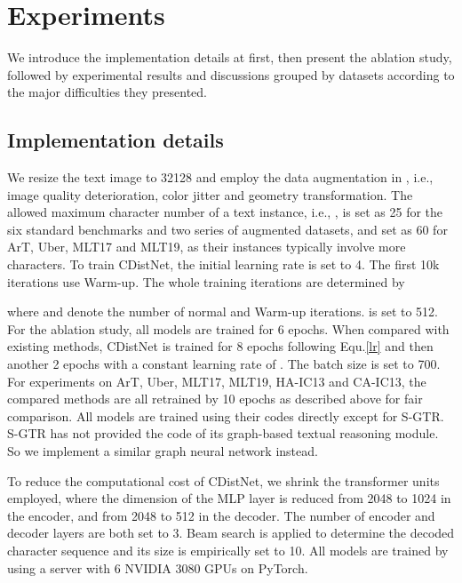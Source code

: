 \section{Experiments}
We introduce the implementation details at first, then present the ablation study, followed by experimental results and discussions grouped by datasets according to the major difficulties they presented.

\subsection{Implementation details}
We resize the text image to 32128 and employ the data augmentation in \citep{ABInet21CVPR}, i.e., image quality deterioration, color jitter and geometry transformation. The allowed maximum character number of a text instance, i.e., , is set as 25 for the six standard benchmarks and two series of augmented datasets, and set as 60 for ArT, Uber, MLT17 and MLT19, as their instances typically involve more characters. To train CDistNet, the initial learning rate is set to 4. The first 10k iterations use Warm-up. The whole training iterations are determined by  

where  and  denote the number of normal and Warm-up iterations.  is set to 512. For the ablation study, all models are trained for 6 epochs. When compared with existing methods, CDistNet is trained for 8 epochs following Equ.\ref{lr} and then another 2 epochs with a constant learning rate of . The batch size is set to 700. For experiments on ArT, Uber, MLT17, MLT19, HA-IC13 and CA-IC13, the compared methods are all retrained by 10 epochs as described above for fair comparison. All models are trained using their codes directly except for S-GTR. S-GTR has not provided the code of its graph-based textual reasoning module. So we implement a similar graph neural network instead.

To reduce the computational cost of CDistNet, we shrink the transformer units employed, where the dimension of the MLP layer is reduced from 2048 to 1024 in the encoder, and from 2048 to 512 in the decoder. The number of encoder and decoder layers are both set to 3. Beam search is applied to determine the decoded character sequence and its size is empirically set to 10. All models are trained by using a server with 6 NVIDIA 3080 GPUs on PyTorch. 

